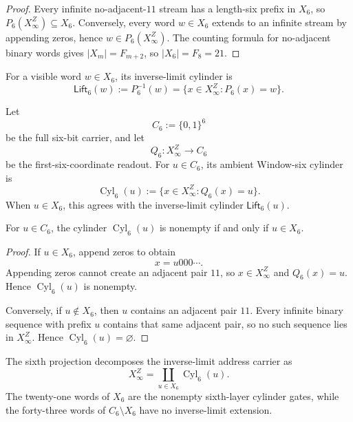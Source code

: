 \begin{proof}
Every infinite no-adjacent-$11$ stream has a length-six prefix in $X_6$, so
$P_6(X_\infty^Z)\subseteq X_6$.  Conversely, every word $w\in X_6$ extends
to an infinite stream by appending zeros, hence $w\in P_6(X_\infty^Z)$.
The counting formula for no-adjacent binary words gives
$|X_m|=F_{m+2}$, so $|X_6|=F_8=21$.
\end{proof}

\begin{definition}
\label{def:axiszeckendorf-window-cylinder}
For a visible word $w\in X_6$, its inverse-limit cylinder is
$$
\mathsf{Lift}_6(w)
:=
P_6^{-1}(w)
=
\{x\in X_\infty^Z:P_6(x)=w\}.
$$
\end{definition}

\begin{definition}
\label{def:axiszeckendorf-ambient-window-six-cylinder}
Let
$$
C_6:=\{0,1\}^6
$$
be the full six-bit carrier, and let
$$
Q_6:X_\infty^Z\to C_6
$$
be the first-six-coordinate readout.  For $u\in C_6$, its ambient
Window-six cylinder is
$$
\operatorname{Cyl}_6(u)
:=
\{x\in X_\infty^Z:Q_6(x)=u\}.
$$
When $u\in X_6$, this agrees with the inverse-limit cylinder
$\mathsf{Lift}_6(u)$.
\end{definition}

\begin{proposition}
\label{prop:axiszeckendorf-window-six-extension-boundary}
For $u\in C_6$, the cylinder $\operatorname{Cyl}_6(u)$ is nonempty if and
only if $u\in X_6$.
\end{proposition}

\begin{proof}
If $u\in X_6$, append zeros to obtain
$$
x=u000\cdots .
$$
Appending zeros cannot create an adjacent pair $11$, so
$x\in X_\infty^Z$ and $Q_6(x)=u$.  Hence
$\operatorname{Cyl}_6(u)$ is nonempty.

Conversely, if $u\notin X_6$, then $u$ contains an adjacent pair $11$.
Every infinite binary sequence with prefix $u$ contains that same adjacent
pair, so no such sequence lies in $X_\infty^Z$.  Hence
$\operatorname{Cyl}_6(u)=\varnothing$.
\end{proof}

\begin{corollary}
\label{cor:axiszeckendorf-window-six-cylinder-partition}
The sixth projection decomposes the inverse-limit address carrier as
$$
X_\infty^Z
=
\coprod_{u\in X_6}\operatorname{Cyl}_6(u).
$$
The twenty-one words of $X_6$ are the nonempty sixth-layer cylinder gates,
while the forty-three words of $C_6\setminus X_6$ have no inverse-limit
extension.
\end{corollary}

